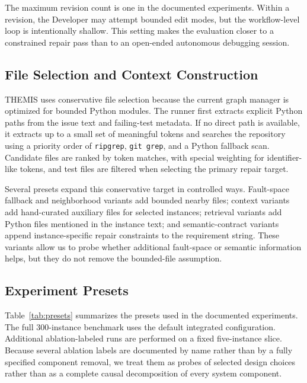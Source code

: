 \documentclass[11pt]{article}
\begin{document}
The maximum revision count is one in the documented experiments.  Within a revision, the Developer may attempt bounded edit modes, but the workflow-level loop is intentionally shallow.  This setting makes the evaluation closer to a constrained repair pass than to an open-ended autonomous debugging session.

\subsection{File Selection and Context Construction}
\label{subsec:file-selection}

THEMIS uses conservative file selection because the current graph manager is optimized for bounded Python modules.  The runner first extracts explicit Python paths from the issue text and failing-test metadata.  If no direct path is available, it extracts up to a small set of meaningful tokens and searches the repository using a priority order of \texttt{ripgrep}, \texttt{git grep}, and a Python fallback scan.  Candidate files are ranked by token matches, with special weighting for identifier-like tokens, and test files are filtered when selecting the primary repair target.

Several presets expand this conservative target in controlled ways.  Fault-space fallback and neighborhood variants add bounded nearby files; context variants add hand-curated auxiliary files for selected instances; retrieval variants add Python files mentioned in the instance text; and semantic-contract variants append instance-specific repair constraints to the requirement string.  These variants allow us to probe whether additional fault-space or semantic information helps, but they do not remove the bounded-file assumption.

\subsection{Experiment Presets}
\label{subsec:presets}

Table~\ref{tab:presets} summarizes the presets used in the documented experiments.  The full 300-instance benchmark uses the default integrated configuration.  Additional ablation-labeled runs are performed on a fixed five-instance slice.  Because several ablation labels are documented by name rather than by a fully specified component removal, we treat them as probes of selected design choices rather than as a complete causal decomposition of every system component.
\end{document}
